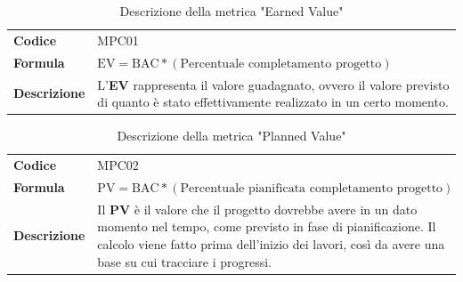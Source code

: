 \documentclass[a4paper,12pt]{article}
\begin{document}
        
            {\renewcommand{\arraystretch}{1.4}
            \begin{table}[H]
            \centering
            \begin{tabularx}{\textwidth}{|l|X|}
                \hline
                \rowcolor{gold}
                \multicolumn{2}{|c|}{\textbf{Earned Value (EV)}}\\
                \hline
                \textbf{Codice} & MPC01\\
                \hline
                \textbf{Formula} & \( \displaystyle \text{EV} = \text{BAC}*(\text{Percentuale completamento progetto}) \) \\
                \hline
                \textbf{Descrizione} & L'\textbf{EV} rappresenta il valore guadagnato, ovvero il valore previsto di quanto è stato effettivamente realizzato in un certo momento. \\
                \hline
            \end{tabularx}      
            \caption{Descrizione della metrica "Earned Value"}
            \end{table}
            }
    
    
            {\renewcommand{\arraystretch}{1.4}
            \begin{table}[H]
            \centering
            \begin{tabularx}{\textwidth}{|l|X|}
                \hline
                \rowcolor{gold}
                \multicolumn{2}{|c|}{\textbf{Planned Value (PV)}}\\
                \hline
                \textbf{Codice} & MPC02\\
                \hline
                \textbf{Formula} & \( \displaystyle \text{PV} = \text{BAC}*(\text{Percentuale pianificata completamento progetto}) \) \\
                \hline
                \textbf{Descrizione} & Il \textbf{PV} è il valore che il progetto dovrebbe avere in un dato momento nel tempo, come previsto in fase di pianificazione. Il calcolo viene fatto prima dell'inizio dei lavori, così da avere una base su cui tracciare i progressi. \\
                \hline
            \end{tabularx}      
            \caption{Descrizione della metrica "Planned Value"}
            \end{table}
            }
    
\end{document}
